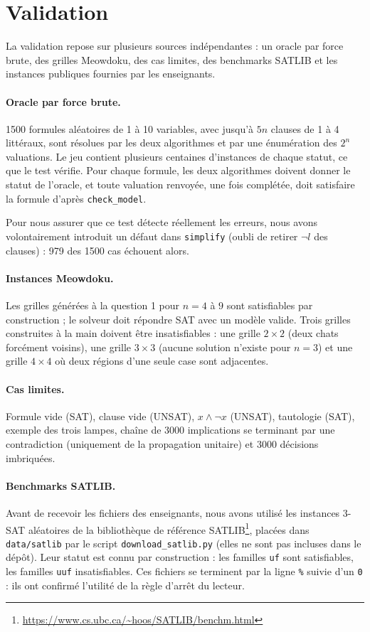 \documentclass[11pt,a4paper]{article}
\begin{document}
\section{Validation}

La validation repose sur plusieurs sources indépendantes : un oracle par
force brute, des grilles Meowdoku, des cas limites, des benchmarks SATLIB et
les instances publiques fournies par les enseignants.

\paragraph{Oracle par force brute.} 1500 formules aléatoires de 1 à 10
variables, avec jusqu'à $5n$ clauses de 1 à 4 littéraux, sont résolues par les
deux algorithmes et par une énumération des $2^n$ valuations. Le jeu contient
plusieurs centaines d'instances de chaque statut, ce que le test vérifie.
Pour chaque formule, les deux algorithmes doivent donner le statut de
l'oracle, et toute valuation renvoyée, une fois complétée, doit satisfaire
la formule d'après \texttt{check\_model}.

Pour nous assurer que ce test détecte réellement les erreurs, nous avons
volontairement introduit un défaut dans \texttt{simplify} (oubli de retirer
$\neg l$ des clauses) : 979 des 1500 cas échouent alors.

\paragraph{Instances Meowdoku.} Les grilles générées à la question 1 pour
$n=4$ à $9$ sont satisfiables par construction ; le solveur doit répondre SAT
avec un modèle valide. Trois grilles construites à la main doivent être
insatisfiables : une grille $2\times2$ (deux chats forcément voisins), une
grille $3\times3$ (aucune solution n'existe pour $n=3$) et une grille
$4\times4$ où deux régions d'une seule case sont adjacentes.

\paragraph{Cas limites.} Formule vide (SAT), clause vide (UNSAT),
$x\land\neg x$ (UNSAT), tautologie (SAT), exemple des trois lampes,
chaîne de 3000 implications se terminant par une contradiction (uniquement
de la propagation unitaire) et 3000 décisions imbriquées.

\paragraph{Benchmarks SATLIB.} Avant de recevoir les fichiers des
enseignants, nous avons utilisé les instances 3-SAT aléatoires de la bibliothèque de référence
SATLIB\footnote{\url{https://www.cs.ubc.ca/~hoos/SATLIB/benchm.html}},
placées dans \texttt{data/satlib} par le script \texttt{download\_satlib.py}
(elles ne sont pas incluses dans le dépôt). Leur statut est connu par
construction :
les familles \texttt{uf} sont satisfiables, les familles \texttt{uuf}
insatisfiables. Ces fichiers se terminent par la ligne \texttt{\%} suivie
d'un \texttt{0} : ils ont confirmé l'utilité de la règle d'arrêt du lecteur.
\end{document}
